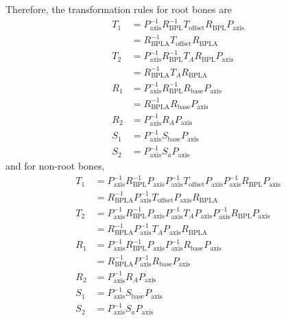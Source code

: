 \documentclass{article}
\begin{document}
Therefore, the transformation rules for root bones are
\begin{align}
T_1 &= P_\mathrm{axis}^{-1} R_\mathrm{BPL}^{-1} T_\mathrm{offset} R_\mathrm{BPL} P_\mathrm{axis} \\
&= R_\mathrm{BPLA}^{-1} T_\mathrm{offset} R_\mathrm{BPLA}\\
T_2 &= P_\mathrm{axis}^{-1} R_\mathrm{BPL}^{-1} T_A R_\mathrm{BPL} P_\mathrm{axis} \\
&= R_\mathrm{BPLA}^{-1} T_A R_\mathrm{BPLA}  \\
R_1 &= P_\mathrm{axis}^{-1} R_\mathrm{BPL}^{-1} R_\mathrm{base} P_\mathrm{axis} \\
&= R_\mathrm{BPLA}^{-1} R_\mathrm{base} P_\mathrm{axis}\\
R_2 &= P_\mathrm{axis}^{-1} R_A P_\mathrm{axis}\\
S_1 &= P_\mathrm{axis}^{-1} S_\mathrm{base} P_\mathrm{axis}\\
S_2 &= P_\mathrm{axis}^{-1} S_a P_\mathrm{axis}
\end{align}
and for non-root bones,
\begin{align}
T_1 &= P_\mathrm{axis}^{-1} R_\mathrm{BPL}^{-1} P_\mathrm{axis} P_\mathrm{axis}^{-1} T_\mathrm{offset} P_\mathrm{axis} P_\mathrm{axis}^{-1}  R_\mathrm{BPL} P_\mathrm{axis} \\
&= R_\mathrm{BPLA}^{-1} P_\mathrm{axis}^{-1} T_\mathrm{offset} P_\mathrm{axis} R_\mathrm{BPLA}\\
T_2 &= P_\mathrm{axis}^{-1} R_\mathrm{BPL}^{-1} P_\mathrm{axis} P_\mathrm{axis}^{-1}  T_A P_\mathrm{axis} P_\mathrm{axis}^{-1} R_\mathrm{BPL} P_\mathrm{axis} \\
&= R_\mathrm{BPLA}^{-1} P_\mathrm{axis}^{-1} T_A P_\mathrm{axis} R_\mathrm{BPLA}  \\
R_1 &= P_\mathrm{axis}^{-1} R_\mathrm{BPL}^{-1}P_\mathrm{axis} P_\mathrm{axis}^{-1}  R_\mathrm{base} P_\mathrm{axis} \\
&= R_\mathrm{BPLA}^{-1} P_\mathrm{axis}^{-1}  R_\mathrm{base} P_\mathrm{axis}\\
R_2 &= P_\mathrm{axis}^{-1} R_A P_\mathrm{axis}\\
S_1 &= P_\mathrm{axis}^{-1} S_\mathrm{base} P_\mathrm{axis}\\
S_2 &= P_\mathrm{axis}^{-1} S_a P_\mathrm{axis}
\end{align}
\end{document}
